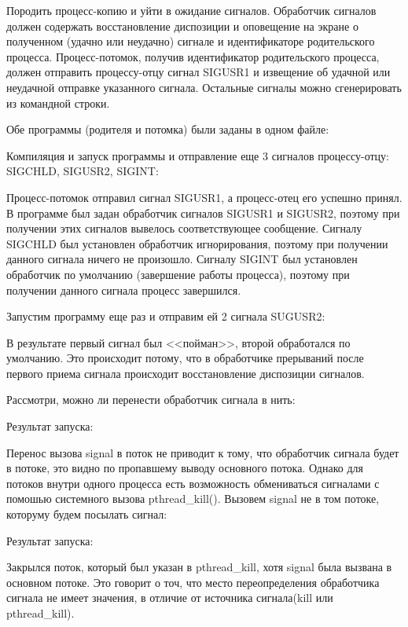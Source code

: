 \documentclass[a4paper]{article}
\begin{document}
	Породить процесс-копию и уйти в ожидание сигналов. Обработчик сигналов должен содержать восстановление диспозиции и оповещение на экране о полученном (удачно или неудачно) сигнале и идентификаторе родительского процесса. Процесс-потомок, получив идентификатор родительского процесса, должен отправить процессу-отцу сигнал SIGUSR1 и извещение об удачной или неудачной отправке указанного сигнала. Остальные сигналы можно сгенерировать из командной строки.
	
	Обе программы (родителя и потомка) были заданы в одном файле:
	
	
	Компиляция и запуск программы и отправление еще 3 сигналов процессу-отцу: SIGCHLD, SIGUSR2, SIGINT:

	

	Процесс-потомок отправил сигнал SIGUSR1, а процесс-отец его успешно принял. В программе был задан обработчик сигналов SIGUSR1 и SIGUSR2, поэтому при получении этих сигналов вывелось соответствующее сообщение. Сигналу SIGCHLD был установлен обработчик игнорирования, поэтому при получении данного сигнала ничего не произошло. Сигналу SIGINT был установлен обработчик по умолчанию (завершение работы процесса), поэтому при получении данного сигнала процесс завершился.
	
	Запустим программу еще раз и отправим ей 2 сигнала SUGUSR2:
	
	
	В результате первый сигнал был <<пойман>>, второй обработался по умолчанию. Это происходит потому, что в обработчике прерываний после первого приема сигнала происходит восстановление диспозиции сигналов.

	Рассмотри, можно ли перенести обработчик сигнала в нить:
	
	Результат запуска:
	
	Перенос вызова signal в поток не приводит к тому, что обработчик сигнала будет в потоке, это видно по пропавшему выводу основного потока. Однако для потоков внутри одного процесса есть возможность обмениваться сигналами с помошью системного вызова pthread\_kill(). Вызовем signal не в том потоке, которуму будем посылать сигнал:
	
	Результат запуска:
	
	Закрылся поток, который был указан в pthread\_kill, хотя signal была вызвана в основном потоке. Это говорит о точ, что место переопределения обработчика сигнала не имеет значения, в отличие от источника сигнала(kill или pthread\_kill). 
	
\end{document}
